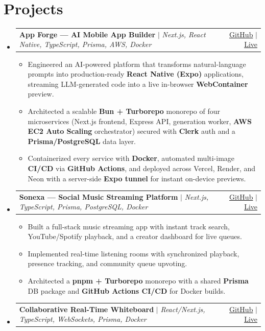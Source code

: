 \documentclass[10pt,a4paper]{article}
\makeatletter
\newcommand{\resumeItem}[1]{
  \item\small{#1}
}
\newcommand{\resumeProjectHeading}[2]{
    \vspace{-1pt}\item
    \begin{tabular*}{0.97\textwidth}{l@{\extracolsep{\fill}}r}
      \small#1 & #2 \\
    \end{tabular*}\vspace{-2pt}
}
\makeatother
\begin{document}
\section{Projects}
\begin{itemize}[leftmargin=0.15in, label={}]
    \resumeProjectHeading
      {\textbf{App Forge --- AI Mobile App Builder} $|$ \emph{Next.js, React Native, TypeScript, Prisma, AWS, Docker}}{ \href{https://github.com/gyana-rj/bolt-mobile-app}{GitHub} $|$ \href{https://bolt-mobile-app-frontend.vercel.app}{Live} \hspace{5pt}}
      \begin{itemize}
        \resumeItem{Engineered an AI-powered platform that transforms natural-language prompts into production-ready \textbf{React Native (Expo)} applications, streaming LLM-generated code into a live in-browser \textbf{WebContainer} preview.}
        \resumeItem{Architected a scalable \textbf{Bun + Turborepo} monorepo of four microservices (Next.js frontend, Express API, generation worker, \textbf{AWS EC2 Auto Scaling} orchestrator) secured with \textbf{Clerk} auth and a \textbf{Prisma/PostgreSQL} data layer.}
        \resumeItem{Containerized every service with \textbf{Docker}, automated multi-image \textbf{CI/CD} via \textbf{GitHub Actions}, and deployed across Vercel, Render, and Neon with a server-side \textbf{Expo tunnel} for instant on-device previews.}
      \end{itemize}
    \resumeProjectHeading
      {\textbf{Sonexa --- Social Music Streaming Platform} $|$ \emph{Next.js, TypeScript, Prisma, PostgreSQL, Docker}}{ \href{https://github.com/gyana-rj/Sonexa}{GitHub} $|$ \href{https://sonexa-web.onrender.com/}{Live} \hspace{5pt}}
      \begin{itemize}
        \resumeItem{Built a full-stack music streaming app with instant track search, YouTube/Spotify playback, and a creator dashboard for live queues.}
        \resumeItem{Implemented real-time listening rooms with synchronized playback, presence tracking, and community queue upvoting.}
        \resumeItem{Architected a \textbf{pnpm + Turborepo} monorepo with a shared \textbf{Prisma} DB package and \textbf{GitHub Actions CI/CD} for Docker builds.}
      \end{itemize}
    \resumeProjectHeading
      {\textbf{Collaborative Real-Time Whiteboard} $|$ \emph{React/Next.js, TypeScript, WebSockets, Prisma, Docker}}{ \href{https://github.com/gyana-rj/collaborative-whiteboard}{GitHub} $|$ \href{https://www.collaborativewhiteboard.tech/}{Live} \hspace{5pt}}

\end{itemize}
\end{document}
